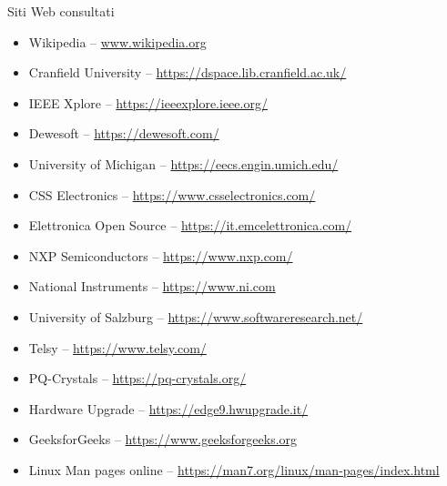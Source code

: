 \cleardoublepage
{}
{}
\nocite{*}


%

\vspace{2.5cm}
\begin{Large}Siti Web consultati\end{Large}
\begin{itemize}
    \item Wikipedia -- \url{www.wikipedia.org}
    \item Cranfield University -- \url{https://dspace.lib.cranfield.ac.uk/}
    \item IEEE Xplore -- \url{https://ieeexplore.ieee.org/}
    \item Dewesoft -- \url{https://dewesoft.com/}
    \item University of Michigan -- \url{https://eecs.engin.umich.edu/}
    \item CSS Electronics -- \url{https://www.csselectronics.com/}
    \item Elettronica Open Source -- \url{https://it.emcelettronica.com/}
    \item NXP Semiconductors -- \url{https://www.nxp.com/}
    \item National Instruments -- \url{https://www.ni.com}
    \item University of Salzburg -- \url{https://www.softwareresearch.net/}
    \item Telsy -- \url{https://www.telsy.com/}
    \item PQ-Crystals -- \url{https://pq-crystals.org/}
    \item Hardware Upgrade -- \url{https://edge9.hwupgrade.it/}
    \item GeeksforGeeks -- \url{https://www.geeksforgeeks.org}
    \item Linux Man pages online -- \url{https://man7.org/linux/man-pages/index.html}
\end{itemize}

